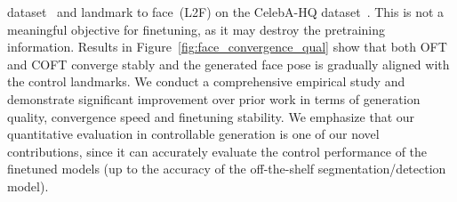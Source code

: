 \begin{itemize}[leftmargin=*,nosep]
\begin{itemize}[leftmargin=*,nosep]
dataset~\cite{zhou2017scene} and landmark to face~(L2F) on the CelebA-HQ dataset~\cite{karras2018progressive,xia2021tedigan}. This is not a meaningful objective for finetuning, as it may destroy the pretraining information. Results in Figure~\ref{fig:face_convergence_qual} show that both OFT and COFT converge stably and the generated face pose is gradually aligned with the control landmarks. We conduct a comprehensive empirical study and demonstrate significant improvement over prior work in terms of generation quality, convergence speed and finetuning stability. We emphasize that our quantitative evaluation in controllable generation is one of our novel contributions, since it can accurately evaluate the control performance of the finetuned models (up to the accuracy of the off-the-shelf segmentation/detection model). 
\begin{abstract}

\end{abstract}
\end{itemize}
\end{itemize}
